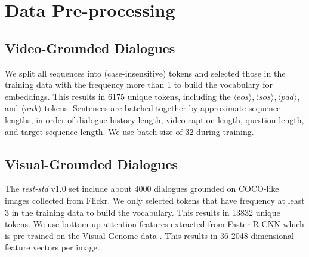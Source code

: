 \documentclass[11pt,a4paper]{article}
\begin{document}
\section{Data Pre-processing}
\subsection{Video-Grounded Dialogues}
\label{app:data_preprocessing_video}
We split all sequences into (case-insensitive) tokens and selected those in the training data with the frequency more than 1 to build the vocabulary for embeddings. This results in 6175 unique tokens, including the $\langle eos \rangle, \langle sos \rangle, \langle pad \rangle $, and $ \langle unk \rangle$ tokens. 
Sentences are batched together by approximate sequence lengths, in order of dialogue history length, video caption length, question length, and target sequence length. We use batch size of 32 during training. 

\subsection{Visual-Grounded Dialogues}
\label{app:data_preprocessing_visual}
The \textit{test-std} v1.0 set include about 4000 dialogues grounded on COCO-like images collected from Flickr. We only selected tokens that have frequency at least 3 in the training data to build the vocabulary. This results in 13832 unique tokens. We use bottom-up attention features \cite{anderson2018bottom} extracted from Faster R-CNN \cite{ren2015faster} which is pre-trained on the Visual Genome data \cite{krishna2017visual}. This results in 36 2048-dimensional feature vectors per image. 
\end{document}
